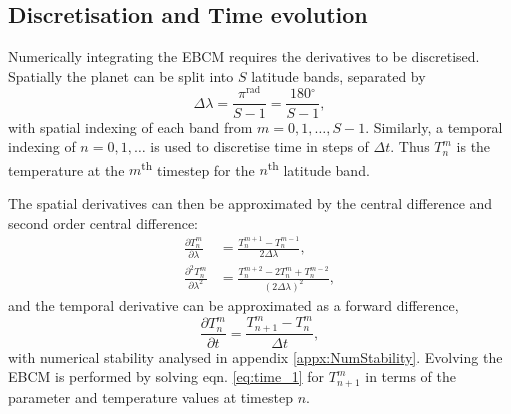 \documentclass[12pt, onecolumn]{revtex4-2}    %
\newcommand{\radians}{\ensuremath{^{\text{rad}}}}
\newcommand{\degrees}{\ensuremath{^{\circ}}}
\newcommand{\partialderiv}[2]{\frac{\partial {#1}}{\partial {#2}}}
\newcommand{\partialderivsecnd}[2]{\frac{\partial^2 {#1}}{\partial {#2}^2}}
\begin{document}
\subsection{Discretisation and Time evolution} \label{ssec:DiscretisationPDE}
%
Numerically integrating the EBCM requires the derivatives to be discretised.
Spatially the planet can be split into $S$ latitude bands, separated by
\begin{equation}
  \Delta\lambda = \frac{\pi\radians}{S-1} = \frac{180\degrees}{S-1},
\end{equation}
with spatial indexing of each band from $m=0, 1, \dots, S-1$.
Similarly, a temporal indexing of $n=0, 1, \dots$ is used to discretise time in steps of $\Delta t$.
Thus $T^m_n$ is the temperature at the $m$\textsuperscript{th} timestep for the $n$\textsuperscript{th} latitude band.

The spatial derivatives can then be approximated by the central difference and second order central difference:
\begin{align}
  \partialderiv{T^m_n}{\lambda}      & = \frac{T^{m+1}_n - T^{m-1}_n}{2 \Delta\lambda},     \label{eq:space_1}        \\
  \partialderivsecnd{T^m_n}{\lambda} & = \frac{T^{m+2}_n -2T^m_n + T^{m-2}_n}{(2 \Delta\lambda)^2},\label{eq:space_2}
\end{align}
and the temporal derivative can be approximated as a forward difference,
\begin{equation}
  \partialderiv{T^m_n}{t} = \frac{T^m_{n+1} - T^m_n}{\Delta t},\label{eq:time_1}
\end{equation}
with numerical stability analysed in appendix \ref{appx:NumStability}.
Evolving the EBCM is performed by solving eqn. \eqref{eq:time_1} for $T^m_{n+1}$ in terms of the parameter and temperature values at timestep $n$.
\end{document}
